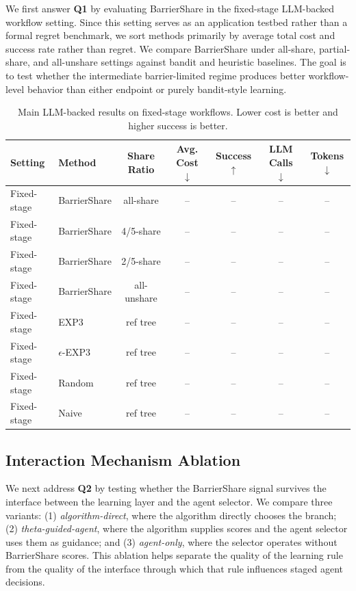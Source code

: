 \documentclass{article}
\begin{document}
We first answer \textbf{Q1} by evaluating BarrierShare in the fixed-stage LLM-backed workflow setting. Since this setting serves as an application testbed rather than a formal regret benchmark, we sort methods primarily by average total cost and success rate rather than regret. We compare BarrierShare under all-share, partial-share, and all-unshare settings against bandit and heuristic baselines. The goal is to test whether the intermediate barrier-limited regime produces better workflow-level behavior than either endpoint or purely bandit-style learning.

\begin{table}[t]
    \centering
    \small
    \caption{Main LLM-backed results on fixed-stage workflows. Lower cost is better and higher success is better.}
    \label{tab:llm_main}
    \begin{tabular}{llccccc}
        \toprule
        Setting & Method & Share Ratio & Avg. Cost $\downarrow$ & Success $\uparrow$ & LLM Calls $\downarrow$ & Tokens $\downarrow$ \\
        \midrule
        Fixed-stage & BarrierShare & all-share & -- & -- & -- & -- \\
        Fixed-stage & BarrierShare & 4/5-share & -- & -- & -- & -- \\
        Fixed-stage & BarrierShare & 2/5-share & -- & -- & -- & -- \\
        Fixed-stage & BarrierShare & all-unshare & -- & -- & -- & -- \\
        Fixed-stage & EXP3 & ref tree & -- & -- & -- & -- \\
        Fixed-stage & $\epsilon$-EXP3 & ref tree & -- & -- & -- & -- \\
        Fixed-stage & Random & ref tree & -- & -- & -- & -- \\
        Fixed-stage & Naive & ref tree & -- & -- & -- & -- \\
        \bottomrule
    \end{tabular}
\end{table}

\subsection{Interaction Mechanism Ablation}

We next address \textbf{Q2} by testing whether the BarrierShare signal survives the interface between the learning layer and the agent selector. We compare three variants:
(1) \emph{algorithm-direct}, where the algorithm directly chooses the branch;
(2) \emph{theta-guided-agent}, where the algorithm supplies scores and the agent selector uses them as guidance; and
(3) \emph{agent-only}, where the selector operates without BarrierShare scores.
This ablation helps separate the quality of the learning rule from the quality of the interface through which that rule influences staged agent decisions.
\end{document}
